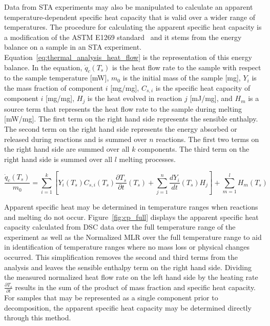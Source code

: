 \documentclass[12pt,oneside]{book}
\begin{document}
Data from STA experiments may also be manipulated to calculate an apparent temperature-dependent specific heat capacity that is valid over a wider range of temperatures. The procedure for calculating the apparent specific heat capacity is a modification of the ASTM E1269 standard~\cite{ASTM_E1269} and it stems from the energy balance on a sample in an STA experiment. Equation~\ref{eq:thermal_analysis_heat_flow} is the representation of this energy balance. In the equation, $\dot{q}_{c}(T_s)$ is the heat flow rate to the sample with respect to the sample temperature [mW], $m_0$ is the initial mass of the sample [mg], $Y_{i}$ is the mass fraction of component $i$ [mg/mg], $C_{s,i}$ is the specific heat capacity of component $i$ [mg/mg], $H_j$ is the heat evolved in reaction $j$ [mJ/mg], and $H_m$ is a source term that represents the heat flow rate to the sample during melting [mW/mg]. The first term on the right hand side represents the sensible enthalpy. The second term on the right hand side represents the energy absorbed or released during reactions and is summed over $n$ reactions. The first two terms on the right hand side are summed over all $k$ components. The third term on the right hand side is summed over all $l$ melting processes.

\begin{equation}
\frac{\dot{q}_{c}(T_s)}{m_0} = \sum_{i=1}^{k} [Y_{i}(T_s)C_{s,i}(T_s)\frac{\partial{T_s}}{\partial{t}}(T_s)+\sum_{j=1}^{n}\frac{dY_{i}}{dt}(T_s)H_j] + \sum_{m=1}^{l} H_m(T_s) \label{eq:thermal_analysis_heat_flow}
\end{equation}

Apparent specific heat may be determined in temperature ranges when reactions and melting do not occur. Figure~\ref{fig:cp_full} displays the apparent specific heat capacity calculated from DSC data over the full temperature range of the experiment as well as the Normalized MLR over the full temperature range to aid in identification of temperature ranges where no mass loss or physical changes occurred. This simplification removes the second and third terms from the analysis and leaves the sensible enthalpy term on the right hand side. Dividing the measured normalized heat flow rate on the left hand side by the heating rate $\frac{\partial{T_s}}{\partial{t}}$ results in the sum of the product of mass fraction and specific heat capacity. For samples that may be represented as a single component prior to decomposition, the apparent specific heat capacity may be determined directly through this method.
\end{document}
